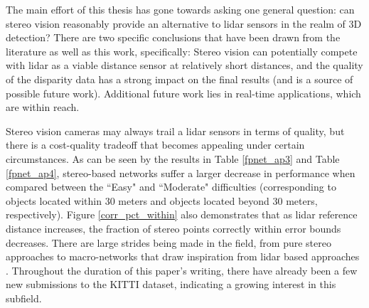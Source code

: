 The main effort of this thesis has gone towards asking one general question: can stereo vision reasonably provide an alternative to lidar sensors in the realm of 3D detection? There are two specific conclusions that have been drawn from the literature as well as this work, specifically: Stereo vision can potentially compete with lidar as a viable distance sensor at relatively short distances, and the quality of the disparity data has a strong impact on the final results (and is a source of possible future work). Additional future work lies in real-time applications, which are within reach. 

Stereo vision cameras may always trail a lidar sensors in terms of quality, but there is a cost-quality tradeoff that becomes appealing under certain circumstances. As can be seen by the results in Table \ref{fpnet_ap3} and Table \ref{fpnet_ap4}, stereo-based networks suffer a larger decrease in performance when compared between the ``Easy" and ``Moderate" difficulties (corresponding to objects located within 30 meters and objects located beyond 30 meters, respectively). Figure \ref{corr_pct_within} also demonstrates that as lidar reference distance increases, the fraction of stereo points correctly within error bounds decreases. There are large strides being made in the field, from pure stereo approaches \cite{zeng2018rt3d,li_stereo_2019} to macro-networks that draw inspiration from lidar based approaches \cite{wang_pseudo-lidar_2019}. Throughout the duration of this paper's writing, there have already been a few new submissions to the KITTI dataset, indicating a growing interest in this subfield. 



